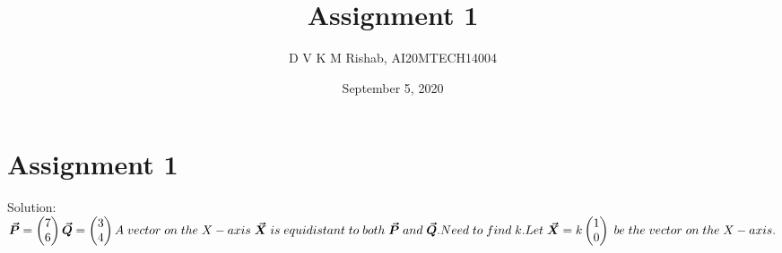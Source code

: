 \documentclass{article}
\title{Assignment 1}
\author{D V K M Rishab, AI20MTECH14004 }
\date{September 5, 2020}
\newcommand{\myvec}[1]{\ensuremath{\begin{pmatrix}#1\end{pmatrix}}}
\begin{document}
\maketitle
\section*{Assignment 1}
Solution: 
\newline \newline
\begin{math}
\bm{\vec{P}} = \myvec{7\\6} \newline \newline \newline
\bm{\vec{Q}} = \myvec{3\\4} \newline \newline \newline
A \hspace{0.1cm} vector \hspace{0.1cm} on \hspace{0.1cm} the \hspace{0.1cm} X-axis \hspace{0.1cm} \bm{\vec{X}} \hspace{0.1cm} is \hspace{0.1cm} equidistant \hspace{0.1cm} to \hspace{0.1cm} both \hspace{0.1cm} \bm{\vec{P}} \hspace{0.1cm} and \hspace{0.1cm} \bm{\vec{Q}}. \newline \newline
Need \hspace{0.1cm} to \hspace{0.1cm} find \hspace{0.1cm} k. \newline \newline
Let \hspace{0.1cm} \bm{\vec{X}} = k\myvec{1\\0} \hspace{0.1cm} be \hspace{0.1cm} the \hspace{0.1cm} vector \hspace{0.1cm} on \hspace{0.1cm} the \hspace{0.1cm} X-axis. \newline\newline\newline

\end{math}
\end{document}
